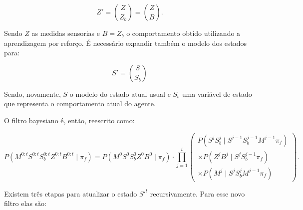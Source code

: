 \begin{equation}
	Z' = \binom{Z}{Z_b} = \binom{Z}{B}.
\end{equation}

Sendo $ Z $ as medidas sensorias e $ B = Z_b $ o comportamento obtido utilizando a aprendizagem por reforço. É necessário expandir também o modelo dos estados para:

\begin{equation}
	S' = \binom{S}{S_b}
\end{equation}

Sendo, novamente, $ S $ o modelo do estado atual usual e $ S_b $ uma variável de estado que representa o comportamento atual do agente.

O filtro bayesiano é, então, reescrito como:

\begin{equation}
        P \left( M^{0: t} S^{0: t} S_b^{0: t} Z^{0: t} B^{0: t} \mid \pi_f \right) = P \left( M^0 S^0 S_b^0 Z^0 B^0 \mid \pi_f \right) \cdot \prod\limits_{j =1}^{t} 
        \left(
            \begin{array}{l}
                P \left( S^j S_b^j \mid S^{j -1} S_b^{j-1} M^{j -1} \pi_f \right) \\
                \times P \left( Z^j B^j \mid S^j S_b^{j-1} \pi_f \right) \\
                \times P \left( M^j \mid S^j S_b^j M^{j -1} \pi_f \right)
            \end{array}
        \right).
\end{equation}

Existem três etapas para atualizar o estado $ S'^t $ recursivamente. Para esse novo filtro elas são:

